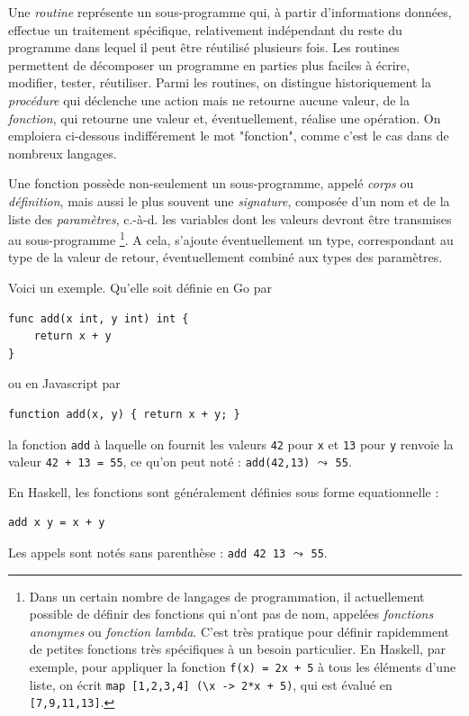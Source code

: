 \documentclass[a4paper,francais]{insalyon}
\newcommand{\cad}{c.-à-d.}
\begin{document}
Une \emph{routine} représente un sous-programme qui, à partir d'informations données, effectue un traitement spécifique, relativement indépendant du reste du programme dans lequel il peut être réutilisé plusieurs fois. Les routines permettent de décomposer un programme en parties plus faciles à écrire, modifier, tester, réutiliser. Parmi les routines, on distingue historiquement la \emph{procédure} qui déclenche une action mais ne retourne aucune valeur, de la \emph{fonction}, qui retourne une valeur et, éventuellement, réalise une opération. On emploiera ci-dessous indifférement le mot "fonction", comme c'est le cas dans de nombreux langages.    

Une fonction possède non-seulement un sous-programme, appelé \emph{corps} ou \emph{définition}, mais aussi le plus souvent une \emph{signature}, composée d'un nom et de la liste des \emph{paramètres}, {\cad} les variables dont les valeurs devront être transmises au sous-programme \cprotect\footnote{Dans un certain nombre de langages de programmation, il actuellement possible de définir des fonctions qui n'ont pas de nom, appelées \emph{fonctions anonymes} ou \emph{fonction lambda}. C'est très pratique pour définir rapidemment de petites fonctions très spécifiques à un besoin particulier. En Haskell, par exemple, pour appliquer la fonction \texttt{f(x) = 2x + 5} à tous les éléments d'une liste, on écrit \verb!map [1,2,3,4] (\x -> 2*x + 5)!, qui est évalué en \verb![7,9,11,13]!.}. A cela, s'ajoute éventuellement un type, correspondant au type de la valeur de retour, éventuellement combiné aux types des paramètres.

Voici un exemple. Qu'elle soit définie en Go par 
\begin{verbatim}
func add(x int, y int) int {
	return x + y
}
\end{verbatim}
ou en Javascript par  
\begin{verbatim}
function add(x, y) { return x + y; }
\end{verbatim}
la fonction \texttt{add} à laquelle on fournit les valeurs \texttt{42} pour \texttt{x} et \texttt{13} pour \texttt{y} renvoie la valeur \verb!42 + 13 = 55!, ce qu'on peut noté : \verb!add(42,13)! $\leadsto$ \texttt{55}.

En Haskell, les fonctions sont généralement définies sous forme equationnelle :  
\begin{verbatim}
add x y = x + y
\end{verbatim}

Les appels sont notés sans parenthèse : \verb!add 42 13! $\leadsto$ \texttt{55}. 
\end{document}
